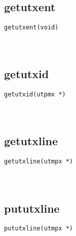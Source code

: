 \documentclass[10pt,a4paper]{article}
\begin{document}
\subsection{getutxent}
\begin{spacing}{2.0}
\lstset{language=C,numbers=none}
\begin{lstlisting}
getutxent(void)
\end{lstlisting}
{\large\color[rgb]{0.2,0.4,0.6}{void:}}
\paragraph{ \ \ }
\end{spacing}

\subsection{getutxid}
\begin{spacing}{2.0}
\lstset{language=C,numbers=none}
\begin{lstlisting}
getutxid(utpmx *)
\end{lstlisting}
{\large\color[rgb]{0.2,0.4,0.6}{*:}}
\paragraph{ \ \ }
\end{spacing}

\subsection{getutxline}
\begin{spacing}{2.0}
\lstset{language=C,numbers=none}
\begin{lstlisting}
getutxline(utmpx *)
\end{lstlisting}
{\large\color[rgb]{0.2,0.4,0.6}{*:}}
\paragraph{ \ \ }
\end{spacing}

\subsection{pututxline}
\begin{spacing}{2.0}
\lstset{language=C,numbers=none}
\begin{lstlisting}
pututxline(utmpx *)
\end{lstlisting}
{\large\color[rgb]{0.2,0.4,0.6}{*:}}
\paragraph{ \ \ }
\end{spacing}
\end{document}
